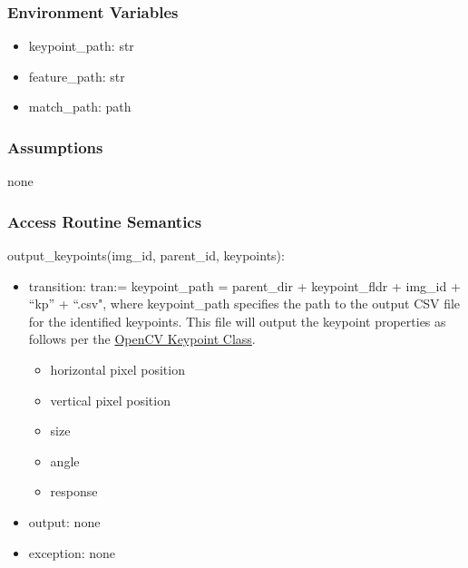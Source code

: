 \documentclass[12pt, titlepage]{article}
\begin{document}
  \subsubsection{Environment Variables}
  \begin{itemize}
    \item keypoint\_path: str
    \item feature\_path: str
    \item match\_path: path
  \end{itemize}
  
  
  \subsubsection{Assumptions}
  none 
  \subsubsection{Access Routine Semantics}
  
  \noindent output\_keypoints(img\_id, parent\_id, keypoints):
  \begin{itemize}
    \item transition: tran:= keypoint\_path = parent\_dir + keypoint\_fldr + img\_id + ``kp'' + ``.csv", where keypoint\_path specifies the 
    path to the output CSV file for the identified keypoints. This file will output the keypoint properties as follows 
    per the \href{https://docs.opencv.org/3.4/d2/d29/classcv_1_1KeyPoint.html}{OpenCV Keypoint Class}.
  
    \begin{itemize}
      \item horizontal pixel position
      \item vertical pixel position
      \item size 
      \item angle
      \item response 
    \end{itemize}
  \item output: none 
  \item exception: none 
  \end{itemize}
  
\end{document}
